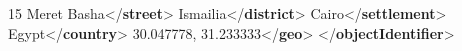 \begin{shaded}
\hspace*{1em}15 Meret Basha{</\textbf{street}>}\mbox{}\newline 
\hspace*{1em}Ismailia{</\textbf{district}>}\mbox{}\newline 
\hspace*{1em}Cairo{</\textbf{settlement}>}\mbox{}\newline 
\hspace*{1em}Egypt{</\textbf{country}>}\mbox{}\newline 
\hspace*{1em}\mbox{}\newline 
\hspace*{1em}\hspace*{1em}30.047778, 31.233333{</\textbf{geo}>}\mbox{}\newline 
\hspace*{1em}\mbox{}\newline 
{}\mbox{}\newline 
{</\textbf{objectIdentifier}>}\end{shaded}\egroup\par \par
